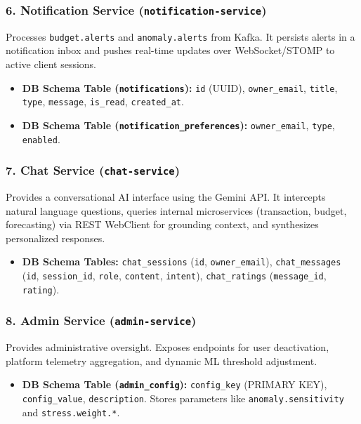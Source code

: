 \documentclass[12pt,a4paper]{report}
\begin{document}
\subsubsection{6. Notification Service (\texttt{notification-service})}
Processes \texttt{budget.alerts} and \texttt{anomaly.alerts} from Kafka. It persists alerts in a notification inbox and pushes real-time updates over WebSocket/STOMP to active client sessions.
\begin{itemize}[leftmargin=1.5em, noitemsep]
  \item \textbf{DB Schema Table (\texttt{notifications}):} \texttt{id} (UUID), \texttt{owner\_email}, \texttt{title}, \texttt{type}, \texttt{message}, \texttt{is\_read}, \texttt{created\_at}.
  \item \textbf{DB Schema Table (\texttt{notification\_preferences}):} \texttt{owner\_email}, \texttt{type}, \texttt{enabled}.
\end{itemize}

\subsubsection{7. Chat Service (\texttt{chat-service})}
Provides a conversational AI interface using the Gemini API. It intercepts natural language questions, queries internal microservices (transaction, budget, forecasting) via REST WebClient for grounding context, and synthesizes personalized responses.
\begin{itemize}[leftmargin=1.5em, noitemsep]
  \item \textbf{DB Schema Tables:} \texttt{chat\_sessions} (\texttt{id}, \texttt{owner\_email}), \texttt{chat\_messages} (\texttt{id}, \texttt{session\_id}, \texttt{role}, \texttt{content}, \texttt{intent}), \texttt{chat\_ratings} (\texttt{message\_id}, \texttt{rating}).
\end{itemize}

\subsubsection{8. Admin Service (\texttt{admin-service})}
Provides administrative oversight. Exposes endpoints for user deactivation, platform telemetry aggregation, and dynamic ML threshold adjustment.
\begin{itemize}[leftmargin=1.5em, noitemsep]
  \item \textbf{DB Schema Table (\texttt{admin\_config}):} \texttt{config\_key} (PRIMARY KEY), \texttt{config\_value}, \texttt{description}. Stores parameters like \texttt{anomaly.sensitivity} and \texttt{stress.weight.*}.
\end{itemize}
\end{document}
